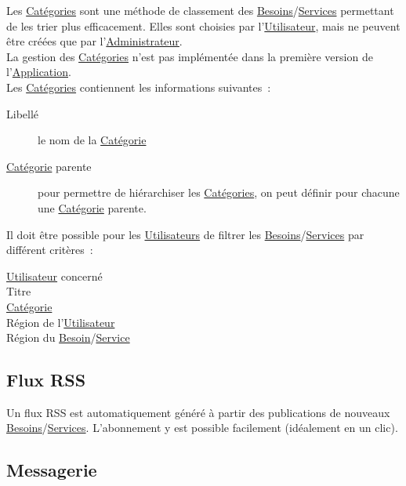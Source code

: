 \documentclass[french,12pt]{article}
\begin{document}
			Les \hyperlink{categorie}{Catégories} sont une méthode de classement des
			 \hyperlink{besoin}{Besoins}/\hyperlink{service}{Services} permettant de
			 les trier plus efficacement. Elles sont choisies par
			 l’\hyperlink{utilisateur}{Utilisateur}, mais ne peuvent être créées que
			 par l’\hyperlink{administrateur}{Administrateur}.\\

			La gestion des \hyperlink{categorie}{Catégories} n’est pas implémentée
			 dans la première version de l’\hyperlink{application}{Application}.\\

			Les \hyperlink{categorie}{Catégories} contiennent les informations
			suivantes :
			\begin{description}
				\item [Libellé]
					le nom de la \hyperlink{categorie}{Catégorie}
				\item [\hyperlink{categorie}{Catégorie} parente]
					pour permettre de hiérarchiser les \hyperlink{categorie}{Catégories},
					 on peut définir pour chacune une \hyperlink{categorie}{Catégorie}
					 parente.
			\end{description}

			Il doit être possible pour les \hyperlink{utilisateur}{Utilisateurs} de
			 filtrer les \hyperlink{besoin}{Besoins}/\hyperlink{service}{Services} par
			 différent critères :
			\begin{description}
				\item [\hyperlink{utilisateur}{Utilisateur} concerné]
				\item [Titre]
				\item [\hyperlink{categorie}{Catégorie}]
				\item [Région de l’\hyperlink{utilisateur}{Utilisateur}]
				\item [Région du \hyperlink{besoin}{Besoin}/\hyperlink{service}{Service}]
			\end{description}

		\newpage
		\subsection{Flux RSS}

			Un flux RSS est automatiquement généré à partir des publications de
			 nouveaux \hyperlink{besoin}{Besoins}/\hyperlink{service}{Services}.
			 L’abonnement y est possible facilement (idéalement en un clic).

		\subsection{Messagerie}
\end{document}
